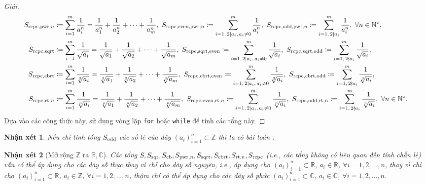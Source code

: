 \documentclass{article}
\newtheorem{nhanxet}{Nhận xét}
\begin{document}
\begin{proof}[Giải]
\begin{align*}
		S_{{\rm rcpc,pwr},n}&\coloneqq\sum_{i=1}^m \frac{1}{a_i^n} = \frac{1}{a_1^n} + \frac{1}{a_2^n} + \cdots + \frac{1}{a_m^n},\ S_{{\rm rcpc,even,pwr},n}\coloneqq\sum_{i=1,\,2\mid a_i,\,a_i\ne0}^m \frac{1}{a_i^n},\ S_{{\rm rcpc,odd,pwr},n}\coloneqq\sum_{i=1,\,2\nmid a_i}^m \frac{1}{a_i^n},\ \forall n\in\mathbb{N}^\star,\\
		S_{\rm rcpc,sqrt}&\coloneqq\sum_{i=1}^m \frac{1}{\sqrt{a_i}} = \frac{1}{\sqrt{a_1}} + \frac{1}{\sqrt{a_2}} + \cdots + \frac{1}{\sqrt{a_m}},\ S_{\rm rcpc,sqrt,even}\coloneqq\sum_{i=1,\,2\mid a_i,\,a_i\ne0}^m \frac{1}{\sqrt{a_i}},\ S_{\rm rcpc,sqrt,odd}\coloneqq\sum_{i=1,\,2\nmid a_i}^m \frac{1}{\sqrt{a_i}},\\
		S_{\rm rcpc,cbrt}&\coloneqq\sum_{i=1}^m \frac{1}{\sqrt[3]{a_i}} = \frac{1}{\sqrt[3]{a_1}} + \frac{1}{\sqrt[3]{a_2}} + \cdots + \frac{1}{\sqrt[3]{a_m}},\ S_{\rm rcpc,cbrt,even}\coloneqq\sum_{i=1,\,2\mid a_i,\,a_i\ne0}^m \frac{1}{\sqrt[3]{a_i}},\ S_{\rm rcpc,cbrt,odd}\coloneqq\sum_{i=1,\,2\nmid a_i}^m \frac{1}{\sqrt[3]{a_i}},\\
		S_{{\rm rcpc,rt},n}&\coloneqq\sum_{i=1}^m \frac{1}{\sqrt[n]{a_i}} = \frac{1}{\sqrt[n]{a_1}} + \frac{1}{\sqrt[n]{a_2}} + \cdots + \frac{1}{\sqrt[n]{a_m}},\ S_{{\rm rcpc,even,rt},n}\coloneqq\sum_{i=1,\,2\mid a_i,\,a_i\ne0}^m \frac{1}{\sqrt[n]{a_i}},\ S_{{\rm rcpc,odd,rt},n}\coloneqq\sum_{i=1,\,2\nmid a_i}^m \frac{1}{\sqrt[n]{a_i}},\ \forall n\in\mathbb{N}^\star.
	\end{align*}
	Dựa vào các công thức này, sử dụng vòng lặp \texttt{for} hoặc \texttt{while} để tính các tổng này.
\end{proof}

\begin{nhanxet}
	Nếu chỉ tính tổng $S_{\rm odd}$ các số lẻ của dãy $(a_i)_{i=1}^n\subset\mathbb{Z}$ thì ta có bài toán \emph{\cite[3., p. 25, Tây Ninh 2019]{VietSTEM2021}}.
\end{nhanxet}

\begin{nhanxet}[Mở rộng $\mathbb{Z}$ ra $\mathbb{R},\mathbb{C}$]
	Các tổng $S,S_{\rm sqr},S_{\rm cb},S_{{\rm pwr},n},S_{\rm sqrt},S_{\rm cbrt},S_{{\rm rt},n},S_{\rm rcpc}$ (i.e., các tổng không có liên quan đến tính chẵn lẻ) vẫn có thể áp dụng cho các dãy số thực thay vì chỉ cho dãy số nguyên, i.e., áp dụng cho $(a_i)_{i=1}^n\subset\mathbb{R}$, $a_i\in\mathbb{R}$, $\forall i = 1,2,\ldots,n$, thay vì chỉ cho $(a_i)_{i=1}^n\subset\mathbb{R}$, $a_i\in\mathbb{Z}$, $\forall i = 1,2,\ldots,n$, thậm chí có thể áp dụng cho các dãy số phức $(a_i)_{i=1}^n\subset\mathbb{C}$, $a_i\in\mathbb{C}$, $\forall i = 1,2,\ldots,n$.
\end{nhanxet}
\end{document}
